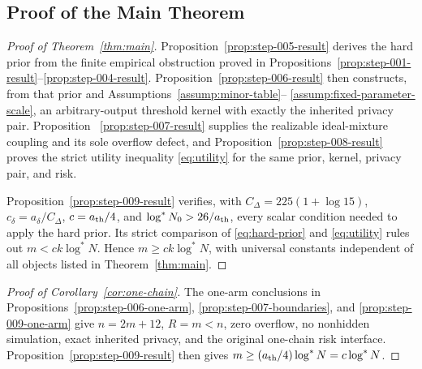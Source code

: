 \subsection{Proof of the Main Theorem}
\label{app:main-proof}

\begin{proof}[Proof of Theorem~\ref{thm:main}]
Proposition~\ref{prop:step-005-result} derives the hard prior from the
finite empirical obstruction proved in
Propositions~\ref{prop:step-001-result}--\ref{prop:step-004-result}.
Proposition~\ref{prop:step-006-result} then constructs, from that prior and
Assumptions~\ref{assump:minor-table}--
\ref{assump:fixed-parameter-scale}, an arbitrary-output threshold kernel
with exactly the inherited privacy pair.  Proposition~
\ref{prop:step-007-result} supplies the realizable ideal-mixture coupling
and its sole overflow defect, and Proposition~\ref{prop:step-008-result}
proves the strict utility inequality \eqref{eq:utility} for the same prior,
kernel, privacy pair, and risk.

Proposition~\ref{prop:step-009-result} verifies, with
$C_\Delta=225(1+\log15)$, $c_\delta=a_\delta/C_\Delta$,
$c=a_{\rm th}/4$, and
$\log^*N_0>26/a_{\rm th}$, every scalar condition needed to apply the hard
prior.  Its strict comparison of \eqref{eq:hard-prior} and
\eqref{eq:utility} rules out $m<c k\log^*N$.  Hence
$m\geq c k\log^*N$, with universal constants independent of all objects
listed in Theorem~\ref{thm:main}.
\end{proof}

\begin{proof}[Proof of Corollary~\ref{cor:one-chain}]
The one-arm conclusions in Propositions~\ref{prop:step-006-one-arm},
\ref{prop:step-007-boundaries}, and
\ref{prop:step-009-one-arm} give $n=2m+12$, $R=m<n$, zero overflow, no
nonhidden simulation, exact inherited privacy, and the original one-chain
risk interface.  Proposition~\ref{prop:step-009-result} then gives
$m\geq(a_{\rm th}/4)\log^*N=c\log^*N$.
\end{proof}
